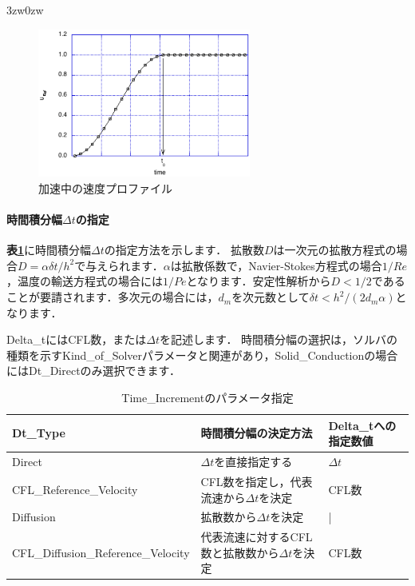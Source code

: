 \begin{indentation}{3zw}{0zw}
\begin{figure}[htdp]
\begin{center}
\includegraphics[width=7cm,clip]{accel_Velocity.eps}
\end{center}
\caption{加速中の速度プロファイル}
\label{fig:accel_velocity}
\end{figure}

%
\paragraph{時間積分幅$\Delta{t}$の指定}
\textbf{表\ref{tbl:delta t inc}}に時間積分幅$\Delta{t}$の指定方法を示します．
拡散数$D$は一次元の拡散方程式の場合$D=\alpha \delta t \slash h^2$で与えられます．$\alpha$は拡散係数で，Navier-Stokes方程式の場合$1/Re$，温度の輸送方程式の場合には$1/Pe$となります．安定性解析から$D<1 \slash 2$であることが要請されます．多次元の場合には，$d_m$を次元数として$\delta t<h^2 \slash (2d_m \alpha)$となります．

Delta\_tにはCFL数，または$\Delta t$を記述します．
時間積分幅の選択は，ソルバの種類を示すKind\_of\_Solverパラメータと関連があり，Solid\_Conductionの場合にはDt\_Directのみ選択できます．

\begin{table}[htdp]
\caption{Time\_Incrementのパラメータ指定}
\begin{center}
\small
\begin{tabular}{lll} \toprule
Dt\_Type & 時間積分幅の決定方法 & Delta\_tへの指定数値\\ \midrule
Direct & $\Delta t$を直接指定する & $\Delta t$\\
CFL\_Reference\_Velocity & CFL数を指定し，代表流速から$\Delta t$を決定 & CFL数\\
Diffusion & 拡散数から$\Delta t$を決定 & |\\
CFL\_Diffusion\_Reference\_Velocity & 代表流速に対するCFL数と拡散数から$\Delta t$を決定 & CFL数\\
 \bottomrule
\end{tabular}
\end{center}
\label{tbl:delta t inc}
\end{table}


\end{indentation}
